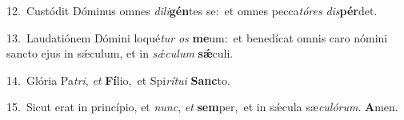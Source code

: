 {\numbfont\textcolor{\numbcolor}{12.}}~Custódit Dóminus omnes \textit{di}\-\textit{li}\textbf{gén}tes se:~\star et omnes pecca\-\textit{tó}\-\textit{res} \textit{dis}\-\textbf{pér}det.\par
{\numbfont\textcolor{\numbcolor}{13.}}~Laudatiónem Dómini loqué\textit{tur} \textit{os} \textbf{me}\-um:~\star et benedícat omnis caro nómini sancto ejus in sǽculum, et in \textit{sǽ}\-\textit{cu}\textit{lum} \textbf{sǽ}\-culi.\par
{\numbfont\textcolor{\numbcolor}{14.}}~Glória Pa\-\textit{tri}\-, \textit{et} \textbf{Fí}\-lio,~\star et Spi\-\textit{rí}\-\textit{tu}\textit{i} \textbf{Sanc}\-to.\par
{\numbfont\textcolor{\numbcolor}{15.}}~Sicut erat in princípio, et \textit{nunc}\-, \textit{et} \textbf{sem}\-per,~\star et in sǽcula sæ\-\textit{cu}\-\textit{ló}\textit{rum}. \textbf{A}\-men.\par

